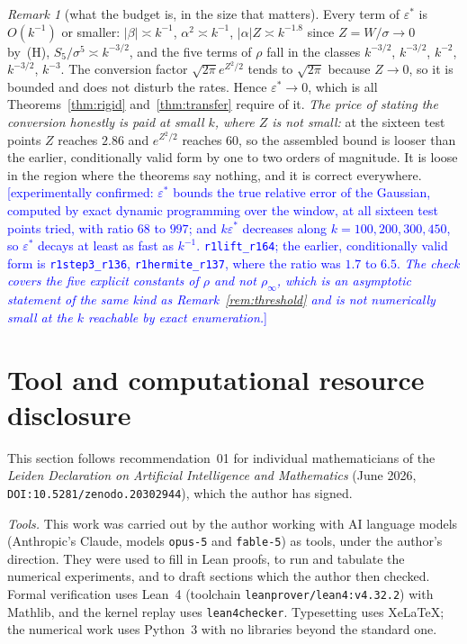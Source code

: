 \documentclass[11pt,a4paper]{article}
\theoremstyle{plain}
\theoremstyle{definition}
\theoremstyle{remark}
\newtheorem{remark}[theorem]{Remark}
\newcommand{\STATUS}[1]{\textcolor{blue}{\textsf{[#1]}}}
\begin{document}
\begin{remark}[what the budget is, in the size that matters]\label{rem:budgetsize}
Every term of $\varepsilon^{*}$ is $O(k^{-1})$ or smaller: $|\beta|\asymp k^{-1}$,
$\alpha^{2}\asymp k^{-1}$, $|\alpha|Z\asymp k^{-1.8}$ since $Z=W/\sigma\to0$
by~\textup{(H)}, $S_5/\sigma^{5}\asymp k^{-3/2}$, and the five terms of $\rho$ fall in the
classes $k^{-3/2}$, $k^{-3/2}$, $k^{-2}$, $k^{-3/2}$, $k^{-3}$. The conversion factor
$\sqrt{2\pi}e^{Z^{2}/2}$ tends to $\sqrt{2\pi}$ because $Z\to0$, so it is bounded and does not
disturb the rates. Hence $\varepsilon^{*}\to0$, which is all Theorems~\ref{thm:rigid}
and~\ref{thm:transfer} require of it. \emph{The price of stating the conversion honestly is
paid at small $k$, where $Z$ is not small:} at the sixteen test points $Z$ reaches $2.86$ and
$e^{Z^{2}/2}$ reaches $60$, so the assembled bound is looser than the earlier, conditionally
valid form by one to two orders of magnitude. It is loose in the region where the theorems say
nothing, and it is correct everywhere.
\STATUS{experimentally confirmed: $\varepsilon^{*}$ bounds the true relative error of the
Gaussian, computed by exact dynamic programming over the window, at all sixteen test points
tried, with ratio $68$ to $997$; and $k\varepsilon^{*}$ decreases along $k=100,200,300,450$, so
$\varepsilon^{*}$ decays at least as fast as $k^{-1}$. \texttt{r1lift\_r164}; the earlier,
conditionally valid form is \texttt{r1step3\_r136}, \texttt{r1hermite\_r137}, where the ratio
was $1.7$ to $6.5$. \emph{The check covers the five explicit constants of $\rho$ and not
$\rho_{\infty}$, which is an asymptotic statement of the same kind as
Remark~\ref{rem:threshold} and is not numerically small at the $k$ reachable by exact
enumeration.}}
\end{remark}

\section*{Tool and computational resource disclosure}
This section follows recommendation~01 for individual mathematicians of the
\emph{Leiden Declaration on Artificial Intelligence and Mathematics} (June 2026,
\texttt{DOI:10.5281/zenodo.20302944}), which the author has signed.

\emph{Tools.} This work was carried out by the author working with AI language models
(Anthropic's Claude, models \texttt{opus-5} and \texttt{fable-5}) as tools, under the
author's direction. They were used to fill in Lean proofs, to run and tabulate the numerical
experiments, and to draft sections which the author then checked. Formal verification uses
Lean~4 (toolchain \texttt{leanprover/lean4:v4.32.2}) with Mathlib, and the kernel replay uses
\texttt{lean4checker}. Typesetting uses Xe\LaTeX{}; the numerical work uses Python~3 with no
libraries beyond the standard one.
\end{document}
